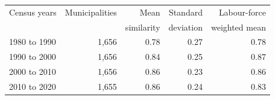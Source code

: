 \begin{tabular}{lrrrr}
\hline\hline
Census years & Municipalities & Mean & Standard & Labour-force \\& & similarity & deviation & weighted mean \\
\hline
1980 to 1990 & 1,656 & 0.78 & 0.27 & 0.78 \\
1990 to 2000 & 1,656 & 0.84 & 0.25 & 0.87 \\
2000 to 2010 & 1,656 & 0.86 & 0.23 & 0.86 \\
2010 to 2020 & 1,655 & 0.86 & 0.24 & 0.83 \\
\hline\hline
\end{tabular}
